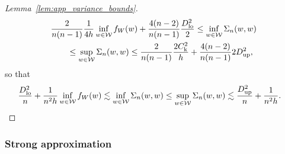 \begin{proof}[Lemma~\ref{lem:app_variance_bounds}]
  \begin{align*}
    &\frac{2}{n(n-1)}
    \frac{1}{4h}
    \inf_{w \in \mathcal{W}} f_W(w)
    + \frac{4(n-2)}{n(n-1)}
    \frac{D_{\textup{lo}}^2}{2}
    \leq
    \inf_{w \in \mathcal{W}} \Sigma_n(w,w) \\
    &\qquad\leq
    \sup_{w \in \mathcal{W}} \Sigma_n(w,w)
    \leq
    \frac{2}{n(n-1)}
    \frac{2 C_\mathrm{k}^2}{h}
    + \frac{4(n-2)}{n(n-1)}
    2 D_{\textup{up}}^2,
  \end{align*}
  so that
  \begin{align*}
    \frac{D_{\textup{lo}}^2}{n}
    + \frac{1}{n^2h}
    \inf_{w \in \mathcal{W}} f_W(w)
    &\lesssim
    \inf_{w \in \mathcal{W}} \Sigma_n(w,w)
    \leq
    \sup_{w \in \mathcal{W}} \Sigma_n(w,w)
    \lesssim
    \frac{D_{\textup{up}}^2}{n}
    + \frac{1}{n^2h}.
  \end{align*}
\end{proof}

\subsubsection{Strong approximation}

